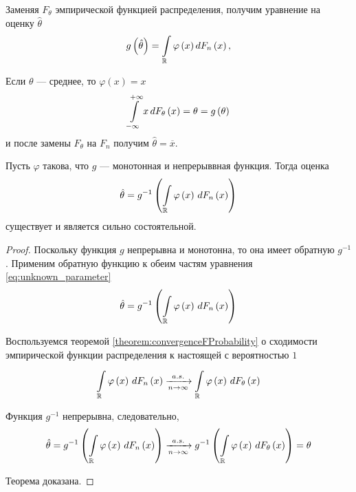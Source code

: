Заменяя $F_{\theta}$ эмпирической функцией распределения, получим уравнение
на оценку $\hat{\theta}$
\begin{equation}\label{eq:unknown_parameter}
  g\left(\hat{\theta}\right)
    =\int\limits_{\mathbb{R}}\varphi\left(x\right)d\cdfn{x},
\end{equation}

\begin{example}
  Если $\theta$ --- среднее, то $\varphi\left(x\right)=x$
  \begin{equation*}
    \integral{-\infty}{+\infty}{\cdfof{\theta}{x}}{x}
    = \theta
    = g\left(\theta\right)
  \end{equation*}
  и после замены $F_\theta$ на $F_n$ получим $\hat{\theta} = \overline{x}$.
\end{example}
\begin{theorem}
  Пусть $\varphi$ такова, что $g$ --- монотонная и непрерыввная функция.
  Тогда оценка
  \begin{equation*}
    \hat{\theta}
    = g^{-1}\left( \integrall{\mathbb{R}}{d\cdfn{x}}{
      \varphi\left( x \right)} \right)
  \end{equation*}
  существует и является сильно состоятельной.
\end{theorem}
\begin{proof}
  Поскольку функция $g$ непрерывна и монотонна,
  то она имеет обратную $g^{-1}$.
  Применим обратную функцию к обеим частям уравнения
  \eqref{eq:unknown_parameter}
  \begin{equation*}
    \hat{\theta}
    = g^{-1}\left( \integrall{\mathbb{R}}{d\cdfn{x}}{\varphi\left( x \right)}
        \right)
  \end{equation*}

  Воспользуемся теоремой \ref{theorem:convergenceFProbability} о сходимости
  эмпирической функции распределения к настоящей с вероятностью $1$
  $$\integrall{\mathbb{R}}{d\cdfn{x}}{\varphi\left( x \right)}
    \acovergence
      \integrall{\mathbb{R}}{d\cdfof{\theta}{x}}{
        \varphi\left( x \right)}$$

  Функция $g^{-1}$ непрерывна, следовательно,
  \begin{equation*}
  \hat{\theta}
  = g^{-1}\left( \integrall{\mathbb{R}}{
    d\cdfn{x}}{\varphi\left( x \right)} \right)
  \acovergence
    g^{-1}\left( \integrall{\mathbb{R}}{
      d\cdfof{\theta}{x}}{\varphi\left( x \right)} \right)
  = \theta
  \end{equation*}

  Теорема доказана.
\end{proof}


